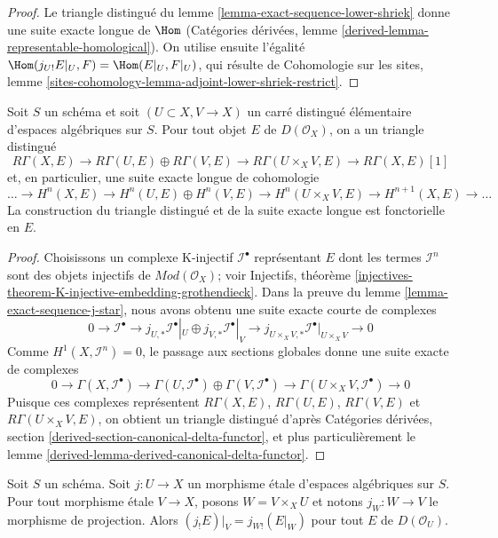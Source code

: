 \begin{proof}
Le triangle distingu\'e du lemme
\ref{lemma-exact-sequence-lower-shriek} donne une suite exacte longue de
$\Hom$ (Cat\'egories d\'eriv\'ees, lemme
\ref{derived-lemma-representable-homological}). On utilise ensuite l'\'egalit\'e
$\Hom(j_{U!}E|_U, F) = \Hom(E|_U, F|_U)$, qui r\'esulte de Cohomologie sur les
sites, lemme
\ref{sites-cohomology-lemma-adjoint-lower-shriek-restrict}.
\end{proof}

\begin{lemma}
\label{lemma-unbounded-mayer-vietoris}
Soit $S$ un sch\'ema et soit $(U \subset X, V \to X)$ un carr\'e distingu\'e
\'el\'ementaire d'espaces alg\'ebriques sur $S$. Pour tout objet $E$ de
$D(\mathcal{O}_X)$, on a un triangle distingu\'e
$$
R\Gamma(X, E) \to R\Gamma(U, E) \oplus R\Gamma(V, E) \to
R\Gamma(U \times_X V, E) \to R\Gamma(X, E)[1]
$$
et, en particulier, une suite exacte longue de cohomologie
$$
\ldots \to
H^n(X, E) \to
H^n(U, E) \oplus H^n(V, E) \to
H^n(U \times_X V, E) \to
H^{n + 1}(X, E) \to \ldots
$$
La construction du triangle distingu\'e et de la suite exacte longue est
fonctorielle en $E$.
\end{lemma}

\begin{proof}
Choisissons un complexe K-injectif $\mathcal{I}^\bullet$ repr\'esentant $E$
dont les termes $\mathcal{I}^n$ sont des objets injectifs de
$\textit{Mod}(\mathcal{O}_X)$; voir Injectifs, th\'eor\`eme
\ref{injectives-theorem-K-injective-embedding-grothendieck}.
Dans la preuve du lemme \ref{lemma-exact-sequence-j-star}, nous avons obtenu
une suite exacte courte de complexes
$$
0 \to \mathcal{I}^\bullet \to
j_{U, *}\mathcal{I}^\bullet|_U \oplus j_{V, *}\mathcal{I}^\bullet|_V \to
j_{U \times_X V, *}\mathcal{I}^\bullet|_{U \times_X V} \to 0
$$
Comme $H^1(X, \mathcal{I}^n) = 0$, le passage aux sections globales donne
une suite exacte de complexes
$$
0 \to \Gamma(X, \mathcal{I}^\bullet) \to
\Gamma(U, \mathcal{I}^\bullet) \oplus
\Gamma(V, \mathcal{I}^\bullet) \to
\Gamma(U \times_X V, \mathcal{I}^\bullet) \to 0
$$
Puisque ces complexes repr\'esentent $R\Gamma(X, E)$, $R\Gamma(U, E)$,
$R\Gamma(V, E)$ et $R\Gamma(U \times_X V, E)$, on obtient un triangle
distingu\'e d'apr\`es Cat\'egories d\'eriv\'ees, section
\ref{derived-section-canonical-delta-functor}, et plus particuli\`erement le
lemme \ref{derived-lemma-derived-canonical-delta-functor}.
\end{proof}

\begin{lemma}
\label{lemma-restrict-lower-shriek}
Soit $S$ un sch\'ema. Soit $j : U \to X$ un morphisme \'etale d'espaces
alg\'ebriques sur $S$. Pour tout morphisme \'etale $V \to X$, posons
$W = V \times_X U$ et notons $j_W : W \to V$ le morphisme de projection.
Alors $(j_!E)|_V = j_{W!}(E|_W)$ pour tout $E$ de $D(\mathcal{O}_U)$.
\end{lemma}


